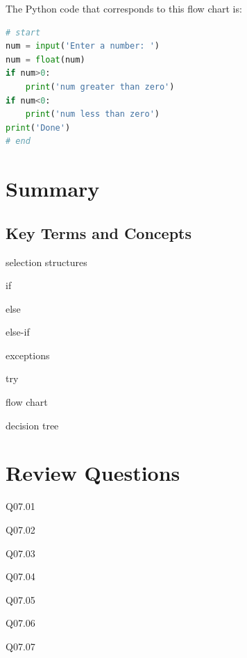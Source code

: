 \documentclass{book}
\newenvironment{problems}{}{}  %
\begin{document}
The Python code that corresponds to this flow chart is:

\begin{lstlisting}[language=Python]
# start
num = input('Enter a number: ')
num = float(num)
if num>0:
    print('num greater than zero')
if num<0:
    print('num less than zero')
print('Done')
# end
\end{lstlisting}
    




    
        \newpage
        \section{Summary}\label{summary}

    




    
        \subsection{Key Terms and Concepts}\label{key-terms-and-concepts}
    




    
        selection structures

if

else

else-if

exceptions

try

flow chart

decision tree
    




    
        \section{Review Questions}\label{review-questions}
    




    
        \begin{problems}
        Q07.01

Q07.02

Q07.03

Q07.04

Q07.05

Q07.06

Q07.07
        \end{problems}
\end{document}
